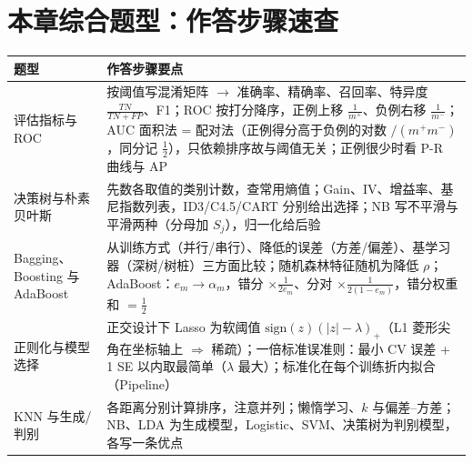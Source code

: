 \section{本章综合题型：作答步骤速查}
\begin{center}\small
\begin{tabularx}{\linewidth}{@{}p{2.6cm}L@{}}
\toprule
题型 & 作答步骤要点 \\
\midrule
评估指标与 ROC & 按阈值写混淆矩阵 $\to$ 准确率、精确率、召回率、特异度 $\frac{TN}{TN+FP}$、F1；ROC 按打分降序，正例上移 $\frac1{m^+}$、负例右移 $\frac1{m^-}$；AUC 面积法 = 配对法（正例得分高于负例的对数 $/(m^+m^-)$，同分记 $\frac12$），只依赖排序故与阈值无关；正例很少时看 P-R 曲线与 AP \\
决策树与朴素贝叶斯 & 先数各取值的类别计数，查常用熵值；Gain、IV、增益率、基尼指数列表，ID3/C4.5/CART 分别给出选择；NB 写不平滑与平滑两种（分母加 $S_j$），归一化给后验 \\
Bagging、Boosting 与 AdaBoost & 从训练方式（并行/串行）、降低的误差（方差/偏差）、基学习器（深树/树桩）三方面比较；随机森林特征随机为降低 $\rho$；AdaBoost：$e_m\to\alpha_m$，错分 $\times\frac1{2e_m}$、分对 $\times\frac1{2(1-e_m)}$，错分权重和 $=\frac12$ \\
正则化与模型选择 & 正交设计下 Lasso 为软阈值 $\mathrm{sign}(z)(|z|-\lambda)_+$（L1 菱形尖角在坐标轴上 $\Rightarrow$ 稀疏）；一倍标准误准则：最小 CV 误差 + 1 SE 以内取最简单（$\lambda$ 最大）；标准化在每个训练折内拟合（Pipeline） \\
KNN 与生成/判别 & 各距离分别计算排序，注意并列；懒惰学习、$k$ 与偏差–方差；NB、LDA 为生成模型，Logistic、SVM、决策树为判别模型，各写一条优点 \\
\bottomrule
\end{tabularx}
\end{center}

